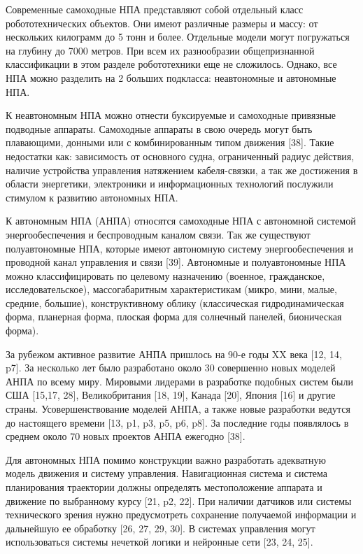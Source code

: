 Современные самоходные НПА представляют собой отдельный класс робототехнических объектов. Они имеют различные размеры и массу: от нескольких килограмм до 5 тонн и более. Отдельные модели могут погружаться на глубину до 7000 метров. При всем их разнообразии общепризнанной классификации в этом разделе робототехники еще не сложилось. Однако, все НПА можно разделить на 2 больших подкласса: неавтономные и автономные НПА.

К неавтономным НПА можно отнести буксируемые и самоходные привязные подводные аппараты. Самоходные аппараты в свою очередь могут быть плавающими, донными или с комбинированным типом движения [38]. Такие недостатки как: зависимость от основного судна, ограниченный радиус действия, наличие устройства управления натяжением кабеля-связки, а так же достижения в области энергетики, электроники и информационных технологий послужили стимулом к развитию автономных НПА.

К автономным НПА (АНПА) относятся самоходные НПА с автономной системой энергообеспечения и беспроводным каналом связи. Так же существуют полуавтономные НПА, которые имеют автономную систему энергообеспечения и проводной канал управления и связи [39]. Автономные и полуавтономные НПА можно классифицировать по целевому назначению (военное, гражданское, исследовательское), массогабаритным характеристикам (микро, мини, малые, средние, большие), конструктивному облику (классическая гидродинамическая форма, планерная форма, плоская форма для солнечный панелей, бионическая форма).

За рубежом активное развитие АНПА пришлось на 90-е годы XX века [12, 14, p7]. За несколько лет было разработано около 30 совершенно новых моделей АНПА по всему миру. Мировыми лидерами в разработке подобных систем были США [15,17, 28], Великобритания [18, 19], Канада [20], Япония [16] и другие страны. Усовершенствование моделей АНПА, а также новые разработки ведутся до настоящего времени [13, p1, p3, p5, p6, p8]. За последние годы появлялось в среднем около 70 новых проектов АНПА ежегодно [38].

Для автономных НПА помимо конструкции важно разработать адекватную модель движения и систему управления. Навигационная система и система планирования траектории должны определять местоположение аппарата и движение по выбранному курсу [21, p2, 22]. При наличии датчиков или системы технического зрения нужно предусмотреть сохранение получаемой информации и дальнейшую ее обработку [26, 27, 29, 30]. В системах управления могут использоваться системы нечеткой логики и нейронные сети [23, 24, 25].

